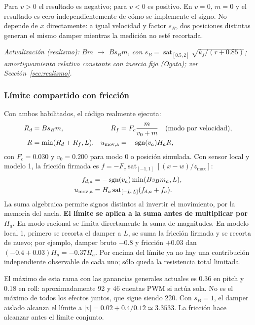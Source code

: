 \documentclass[11pt,a4paper]{article}
\newcommand{\sat}{\operatorname{sat}}
\begin{document}
Para $v>0$ el resultado es negativo; para $v<0$ es positivo. En $v=0$, $m=0$ y el resultado es cero independientemente de cómo se implemente el signo. No depende de $x$ directamente: a igual velocidad y factor $s_B$, dos posiciones distintas generan el mismo damper mientras la medición no esté recortada.

\textit{Actualización (realismo): $Bm$ $\rightarrow$ $Bs_Bm$, con $s_B=\sat_{[0.5,2]}\sqrt{k_f/(r+0.85)}$; amortiguamiento relativo constante con inercia fija (Ogata); ver Sección~\ref{sec:realismo}.}

\subsubsection{Límite compartido con fricción}
Con ambos habilitados, el código realmente ejecuta:
\begin{align}
R_d&=Bs_Bm, & R_f&=F_c\frac{m}{v_0+m}\quad\text{(modo por velocidad)},\\
R&=\min(R_d+R_f,L), &
u_{\rm mov,a}&=-\operatorname{sgn}(v_a)H_aR,
\label{eq:movimiento_conjunto}
\end{align}
con $F_c=0.030$ y $v_0=0.200$ para modo 0 o posición simulada. Con sensor local y modelo 1, la fricción firmada es $f=-F_c\sat_{[-1,1]}[(x-w)/z_{\max}]$:
\begin{align}
f_{d,a}&=-\operatorname{sgn}(v_a)\min(Bs_Bm_a,L),\\
u_{\rm mov,a}&=H_a%
\sat_{[-L,L]}(f_{d,a}+f_a).
\end{align}
La suma algebraica permite signos distintos al invertir el movimiento, por la memoria del ancla. \textbf{El límite se aplica a la suma antes de multiplicar por $H_a$.} En modo racional se limita directamente la suma de magnitudes. En modelo local 1, primero se recorta el damper a $L$, se suma la fricción firmada y se recorta de nuevo; por ejemplo, damper bruto $-0.8$ y fricción $+0.03$ dan $(-0.4+0.03)H_a=-0.37H_a$. Por encima del límite ya no hay una contribución independiente observable de cada uno; sólo queda la resistencia total limitada.

El máximo de esta rama con las ganancias generales actuales es 0.36 en pitch y 0.18 en roll: aproximadamente 92 y 46 cuentas PWM si actúa sola. No es el máximo de todos los efectos juntos, que sigue siendo 220. Con $s_B=1$, el damper aislado alcanza el límite a $|v|=0.02+0.4/0.12\simeq3.3533$. La fricción hace alcanzar antes el límite conjunto.
\end{document}
